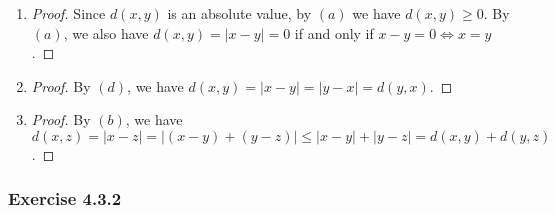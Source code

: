 \documentclass[12pt, letter]{article}
\newcommand{\ssc}{\subsubsection* }
\newcommand{\E}{Exercise }
\begin{document}
\begin{enumerate}[label=(\alph*)]
\begin{proof}
        If $x>0$, $y>0$, then $|xy|=xy=|x||y|$.

        If $x>0$ ($y>0$), $y<0$ $(x<0)$, then $|xy|=-xy=x(-y)=|x||y|$.

        If $x<0$, $y<0$, then $|xy|=xy=(-x)(-y)=|x||y|$.

        Thus, $|xy|=|x||y|$.

        Let $y=-1$, we have $|-x|=x$.
    \end{proof}
    \item \begin{proof}
        Since $d(x,y)$ is an absolute value, by $(a)$ we have $d(x,y)\geq 0$. By $(a)$, we also have $d(x,y)=|x-y|=0$ if and only if $x-y=0\iff x=y$.
    \end{proof}
    \item \begin{proof}
        By $(d)$, we have $d(x,y)=|x-y|=|y-x|=d(y,x)$.
    \end{proof}
    \item \begin{proof}
        By $(b)$, we have $d(x,z)=|x-z|=|(x-y)+(y-z)|\leq|x-y|+|y-z|=d(x,y)+d(y,z)$.
    \end{proof}
\end{enumerate}
\ssc{\E 4.3.2}
\end{document}
